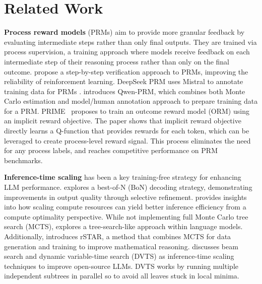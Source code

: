 \section{Related Work}
\textbf{Process reward models} (PRMs) aim to provide more granular feedback by evaluating intermediate steps rather than only final outputs.
They are trained via process supervision, a training approach where models receive feedback on each intermediate step of their reasoning process rather than only on the final outcome.
\citet{lightman2023letsverify} propose a step-by-step verification approach to PRMs, improving the reliability of reinforcement learning.
DeepSeek PRM \cite{wang2024mathshepherdverifyreinforcellms} uses Mistral to annotate training data for PRMs .
\citet{zhang2025lessonsdeveloping} introduces Qwen-PRM, which combines both Monte Carlo estimation and model/human annotation approach to prepare training data for a PRM. %
PRIME~\citep{cui2024process} proposes to train an outcome reward model (ORM) using an implicit reward objective. The paper shows that implicit reward objective directly learns a Q-function that provides rewards for each token, which can be leveraged to create process-level reward signal. This process eliminates the need for any process labels, and reaches competitive performance on PRM benchmarks. 




\textbf{Inference-time scaling} has been a key training-free strategy for enhancing LLM performance. \citet{brown2024largelanguage} explores a best-of-N (BoN) decoding strategy, demonstrating improvements in output quality through selective refinement. \citep{snell2024scalingllm} provides insights into how scaling compute resources can yield better inference efficiency from a compute optimality perspective.
While not implementing full Monte Carlo tree search (MCTS), \citet{zhou2024languageagenttreesearch} explores a tree-search-like approach within language models. 
Additionally, \citet{guan2025rstarmathsmall} introduces rSTAR, a method that combines MCTS for data generation and training to improve mathematical reasoning. \citet{beeching2024scalingtesttimecompute} discusses beam search and dynamic variable-time search (DVTS) as inference-time scaling techniques to improve open-source LLMs. DVTS works by running multiple independent subtrees in parallel so to avoid all leaves stuck in local minima.

